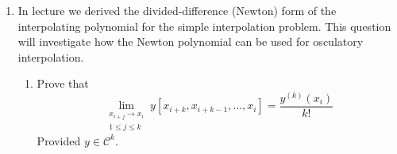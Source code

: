 \documentclass{article}
\begin{document}
\begin{enumerate}
\begin{enumerate}
        \begin{algorithm}[H]
            \SetAlgoNoLine
            \SetEndCharOfAlgoLine{}
        \end{algorithm}
        \end{enumerate}
    \newpage
    \item In lecture we derived the divided-difference (Newton) form of the interpolating polynomial for the simple interpolation problem. This question will investigate how the Newton polynomial can be used for osculatory interpolation.
        \begin{enumerate}
            \item Prove that
                \[ \lim_{\substack{x_{i+j} \rightarrow x_i \\ 1 \leq j \leq k}}y[x_{i+k},x_{i+k-1},\dots,x_i] = \frac{y^{(k)}(x_i)}{k!} \]
                Provided $y \in \mathcal C^k$.


\end{enumerate}
\end{enumerate}
\end{document}
